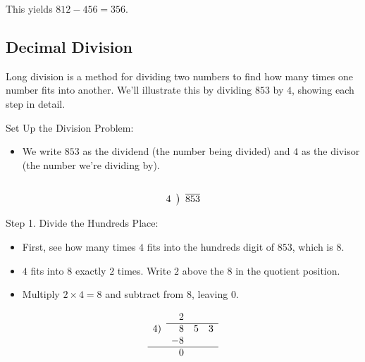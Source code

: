 This yields \( 812 - 456 = 356 \).



\subsection{Decimal Division}
Long division is a method for dividing two numbers to find how many times one number fits into another. We’ll illustrate this by dividing \( 853 \) by \( 4 \), showing each step in detail.

\vspace{\baselineskip}\par
Set Up the Division Problem:
 \begin{itemize}
    \item We write \( 853 \) as the dividend (the number being divided) and \( 4 \) as the divisor (the number we’re dividing by).
    \end{itemize}

\[
\begin{array}{r@{\hskip\arraycolsep}c@{\hskip\arraycolsep}l}
&  & \\
4 &\big)& \overline{853} \\
\end{array}
\]

\vspace{\baselineskip}\par
Step 1. Divide the Hundreds Place:
 \begin{itemize}
    \item First, see how many times \( 4 \) fits into the hundreds digit of \( 853 \), which is \( 8 \).
    \item \( 4 \) fits into \( 8 \) exactly \( 2 \) times. Write \( 2 \) above the \( 8 \) in the quotient position.
    \item Multiply \( 2 \times 4 = 8 \) and subtract from \( 8 \), leaving \( 0 \).
    \end{itemize}
\[
\begin{array}{rrrr}
       & 2 &   &  \\
       \cline{2-4}
    4) & 8 & 5 & 3 \\
       & -8 &  &    \\
\hline
    & 0 \\
\end{array}
\]

